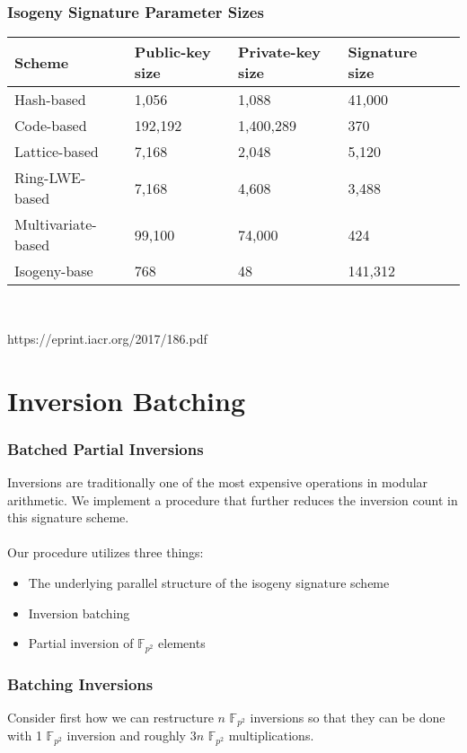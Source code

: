 \documentclass{beamer}
\begin{document}
\begin{frame}
\frametitle{Isogeny Signature Parameter Sizes}
\begin{tabular}{@{}lllll@{}}
	Scheme & Public-key size & Private-key size & Signature size\\
	\midrule
	Hash-based & 1,056 & 1,088 & 41,000\\
	Code-based & 192,192 & 1,400,289 & 370\\
	Lattice-based & 7,168 & 2,048 & 5,120\\
	Ring-LWE-based & 7,168 & 4,608 & 3,488\\
	Multivariate-based & 99,100 & 74,000 & 424\\
	\midrule
	Isogeny-base & 768 & 48 & 141,312\\
\end{tabular}\\
\begin{center}
\begingroup \fontsize{8pt}{8pt}\selectfont
https://eprint.iacr.org/2017/186.pdf
\endgroup
\end{center}
\end{frame}

\section{Inversion Batching}

\begin{frame}[fragile]
\frametitle{Batched Partial Inversions}
Inversions are traditionally one of the most expensive operations in modular arithmetic. We implement a procedure that further reduces the inversion count in this signature scheme.\\~\\

Our procedure utilizes three things:
\begin{itemize}
\item<1 -> The underlying parallel structure of the isogeny signature scheme
\item<2 -> Inversion batching
\item<3 -> Partial inversion of $\mathbb{F}_{p^{2}}$ elements
\end{itemize}
\end{frame}

\begin{frame}
\frametitle{Batching Inversions}
Consider first how we can restructure $n$ $\mathbb{F}_{p^{2}}$ inversions so that they can be done with 1 $\mathbb{F}_{p^{2}}$ inversion and roughly $3n$ $\mathbb{F}_{p^{2}}$ multiplications.
\end{frame}
\end{document}
